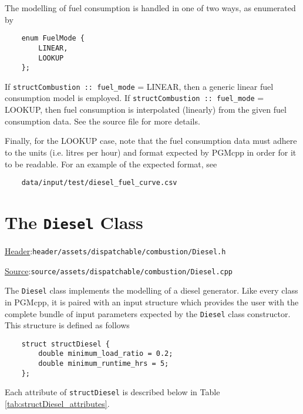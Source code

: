 \documentclass[12pt, letterpaper]{report}
\begin{document}
The modelling of fuel consumption is handled in one of two ways, as enumerated by

\begin{verbatim}
    enum FuelMode {
        LINEAR,
        LOOKUP
    };
\end{verbatim}

\noindent If \texttt{structCombustion :: fuel\_mode} = LINEAR, then a generic linear fuel consumption model is employed. If \texttt{structCombustion :: fuel\_mode} = LOOKUP, then fuel consumption is interpolated (linearly) from the given fuel consumption data. See the source file for more details.\par 
Finally, for the LOOKUP case, note that the fuel consumption data must adhere to the units (i.e. litres per hour) and format expected by PGMcpp in order for it to be readable. For an example of the expected format, see

\begin{verbatim}
    data/input/test/diesel_fuel_curve.csv
\end{verbatim}

\section{The \texttt{Diesel} Class}

\begin{large}
\noindent\underline{Header}:\quad\texttt{header/assets/dispatchable/combustion/Diesel.h}\par
\noindent\underline{Source}:\quad\texttt{source/assets/dispatchable/combustion/Diesel.cpp}\par
\end{large}
\vspace{5mm}

The \texttt{Diesel} class implements the modelling of a diesel generator. Like every class in PGMcpp, it is paired with an input structure which provides the user with the complete bundle of input parameters expected by the \texttt{Diesel} class constructor. This structure is defined as follows

\begin{verbatim}
    struct structDiesel {
        double minimum_load_ratio = 0.2;
        double minimum_runtime_hrs = 5;
    };
\end{verbatim}

\noindent Each attribute of \texttt{structDiesel} is described below in Table \ref{tab:structDiesel_attributes}.
\end{document}
